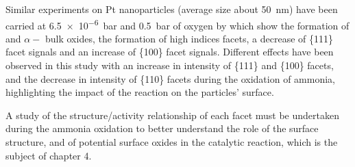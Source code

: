 Similar experiments on Pt nanoparticles (average size about \qty{50}{\nm}) have been carried at \qty{6.5e-6}{\bar} and \qty{0.5}{\bar} of oxygen by \cite{Hejral2013} which show the formation of  and $\alpha-$ bulk oxides, the formation of high indices facets, a decrease of \{111\} facet signals and an increase of \{100\} facet signals.
Different effects have been observed in this study with an increase in intensity of \{111\} and \{100\} facets, and the decrease in intensity of \{110\} facets during the oxidation of ammonia, highlighting the impact of the reaction on the particles' surface.

A study of the structure/activity relationship of each facet must be undertaken during the ammonia oxidation to better understand the role of the surface structure, and of potential surface oxides in the catalytic reaction, which is the subject of chapter 4.